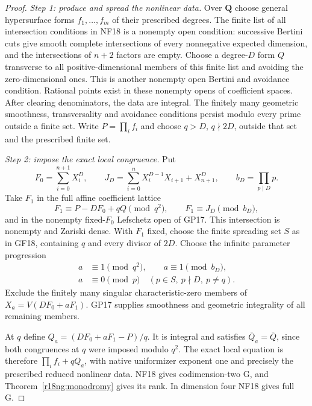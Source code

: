 \begin{proof}
\emph{Step 1: produce and spread the nonlinear data.}
Over $\mathbf Q$ choose general hypersurface forms
$f_1,\ldots,f_m$ of their prescribed degrees.  The
finite list of all intersection conditions in NF18
is a nonempty open condition: successive Bertini
cuts give smooth complete intersections of every
nonnegative expected dimension, and the intersections
of $n+2$ factors are empty.  Choose a degree-$D$ form
$Q$ transverse to all positive-dimensional members
of this finite list and avoiding the zero-dimensional
ones.  This is another nonempty open Bertini and
avoidance condition.  Rational points exist in these
nonempty opens of coefficient spaces.
After clearing denominators, the data are integral.
The finitely many geometric smoothness, transversality
and avoidance conditions persist modulo every prime
outside a finite set.  Write $P=\prod_i f_i$ and
choose $q>D$, $q\nmid2D$, outside that set and the
prescribed finite set.

\emph{Step 2: impose the exact local congruence.}
Put
\[
 F_0=\sum_{i=0}^{n+1}X_i^D,\qquad
 J_D=\sum_{i=0}^{n}X_i^{D-1}X_{i+1}+X_{n+1}^D,
 \qquad b_D=\prod_{p\mid D}p.
\]
Take $F_1$ in the full affine coefficient lattice
\[
        F_1\equiv P-D F_0+qQ\pmod{q^2},
        \qquad F_1\equiv J_D\pmod{b_D},
 \tag{NG18.7}\label{r18ng:coefficient-congruences}
\]
and in the nonempty fixed-$F_0$ Lefschetz open of
GP17.  This intersection is nonempty and Zariski
dense.  With $F_1$ fixed, choose the finite spreading
set $S$ as in GF18, containing $q$ and every divisor
of $2D$.  Choose the infinite parameter progression
\[
 \begin{split}
 a&\equiv1\pmod{q^2},\qquad a\equiv1\pmod{b_D},\\
 a&\equiv0\pmod p\quad(p\in S,\ p\nmid D,\ p\ne q).
 \end{split}
 \tag{NG18.8}\label{r18ng:parameter-congruences}
\]
Exclude the finitely many singular characteristic-zero
members of $X_a=V(D F_0+aF_1)$.  GP17 supplies smoothness
and geometric integrality of all remaining members.

At $q$ define $Q_a=(D F_0+aF_1-P)/q$.  It is integral
and satisfies $\bar Q_a=\bar Q$, since both congruences
at $q$ were imposed modulo $q^2$.  The exact local
equation is therefore $\prod_i f_i+qQ_a$, with native
uniformizer exponent one and precisely the prescribed
reduced nonlinear data.  NF18 gives codimension-two
G, and Theorem~\ref{r18ng:monodromy} gives its rank.
In dimension four NF18 gives full G.


\end{proof}
